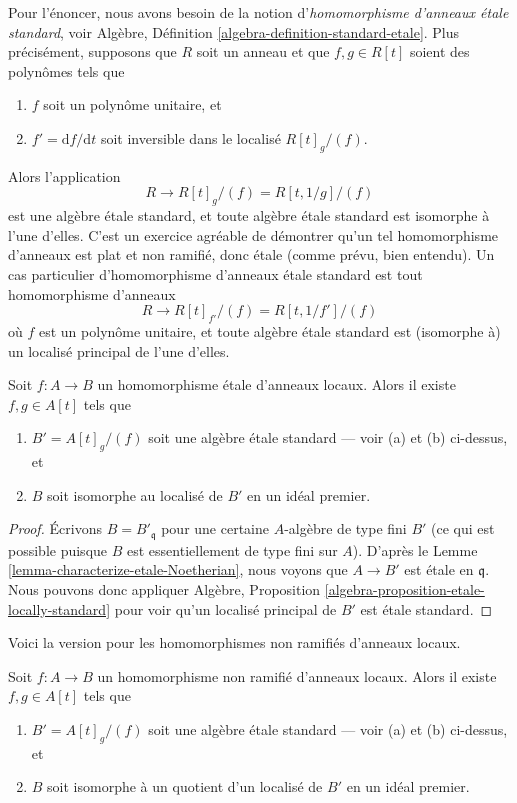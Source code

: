\medskip\noindent
Pour l'énoncer, nous avons besoin de la notion d'{\it homomorphisme d'anneaux \'etale standard}, voir
Algèbre, Définition \ref{algebra-definition-standard-etale}.
Plus précisément, supposons que $R$ soit un anneau et que $f, g \in R[t]$ soient des polynômes
tels que
\begin{enumerate}
\item[(a)] $f$ soit un polynôme unitaire, et
\item[(b)] $f' = \text{d}f/\text{d}t$ soit inversible dans le localisé
$R[t]_g/(f)$.
\end{enumerate}
Alors l'application
$$
R \longrightarrow R[t]_g/(f) = R[t, 1/g]/(f)
$$
est une algèbre \'etale standard, et toute algèbre \'etale standard est isomorphe
à l'une d'elles. C'est un exercice agréable de démontrer qu'un tel homomorphisme d'anneaux
est plat et non ramifié, donc \'etale (comme prévu, bien entendu).
Un cas particulier d'homomorphisme d'anneaux \'etale standard est tout homomorphisme d'anneaux
$$
R \longrightarrow R[t]_{f'}/(f) = R[t, 1/f']/(f)
$$
où $f$ est un polynôme unitaire, et toute algèbre \'etale standard est (isomorphe à)
un localisé principal de l'une d'elles.

\begin{theorem}
\label{theorem-structure-etale}
Soit $f : A \to B$ un homomorphisme \'etale d'anneaux locaux.
Alors il existe $f, g \in A[t]$ tels que
\begin{enumerate}
\item $B' = A[t]_g/(f)$ soit une algèbre \'etale standard --- voir (a) et (b) ci-dessus, et
\item $B$ soit isomorphe au localisé de $B'$ en un idéal premier.
\end{enumerate}
\end{theorem}

\begin{proof}
Écrivons $B = B'_{\mathfrak q}$ pour une certaine $A$-algèbre de type fini $B'$
(ce qui est possible puisque $B$ est essentiellement de type fini sur $A$).
D'après le Lemme \ref{lemma-characterize-etale-Noetherian},
nous voyons que $A \to B'$ est \'etale en $\mathfrak q$.
Nous pouvons donc appliquer
Algèbre, Proposition \ref{algebra-proposition-etale-locally-standard}
pour voir qu'un localisé principal de $B'$ est \'etale standard.
\end{proof}

\noindent
Voici la version pour les homomorphismes non ramifiés d'anneaux locaux.

\begin{theorem}
\label{theorem-structure-unramified}
Soit $f : A \to B$ un homomorphisme non ramifié d'anneaux locaux.
Alors il existe $f, g \in A[t]$ tels que
\begin{enumerate}
\item $B' = A[t]_g/(f)$ soit une algèbre \'etale standard --- voir (a) et (b) ci-dessus, et
\item $B$ soit isomorphe à un quotient d'un localisé de $B'$ en un idéal premier.
\end{enumerate}
\end{theorem}

